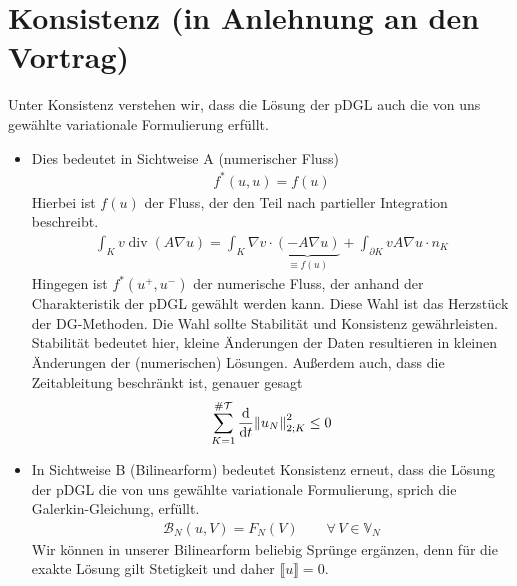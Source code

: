 \section{Konsistenz (in Anlehnung an den Vortrag)}
\label{sec:konsistenz}
Unter Konsistenz verstehen wir, dass die Lösung der pDGL auch die von uns gewählte variationale Formulierung erfüllt.
\begin{itemize}
  \item
Dies bedeutet in Sichtweise A (numerischer Fluss)
\begin{align}
  f^*(u,u) = f(u)
\end{align}
Hierbei ist $f(u)$ der Fluss, der den Teil nach partieller Integration beschreibt.
\begin{align}
  \int_{K} v\operatorname{div}(A\nabla u) = \int_K \nabla v \cdot \underbrace{(-A\nabla u)}_{\equiv f(u)} + \int_{\partial K} v A\nabla u \cdot n_K
\end{align}
Hingegen ist $f^*(u^+,u^-)$ der numerische Fluss, der anhand der Charakteristik der pDGL gewählt werden kann. Diese Wahl ist das Herzstück der DG-Methoden. Die Wahl sollte Stabilität und Konsistenz gewährleisten. Stabilität bedeutet hier, kleine Änderungen der Daten resultieren in kleinen Änderungen der (numerischen) Lösungen. Außerdem auch, dass die Zeitableitung beschränkt ist, genauer gesagt
\begin{align}
  \sum_{K=1}^{\#\mathcal{T}}\frac{\mathrm{d}}{\mathrm{d}t}\norm{u_N}^2_{2;K} \leq 0
\end{align}
\item
In Sichtweise B (Bilinearform) bedeutet Konsistenz erneut, dass die Lösung der pDGL die von uns gewählte variationale Formulierung, sprich die Galerkin-Gleichung, erfüllt.
\begin{align}
  \mathcal{B}_N(u,V) = F_N(V) \qquad \forall \, {V\in\mathbb{V}_N}
\end{align}
Wir können in unserer Bilinearform beliebig Sprünge ergänzen, denn für die exakte Lösung gilt Stetigkeit und daher $\llbracket u \rrbracket = 0$.
\end{itemize}


